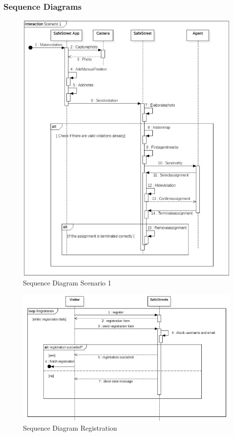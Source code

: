 \subsubsection{Sequence  Diagrams}
\begin{figure}[h]
\centering
\includegraphics{Images/sequence_scenario1.png}
\caption{\label{fig:SDS1}Sequence Diagram Scenario 1}
\end{figure}
\begin{figure}[h]
\centering
\includegraphics{Images/sequence_registration.png}
\caption{\label{fig:SR} Sequence Diagram Registration}
\end{figure}
